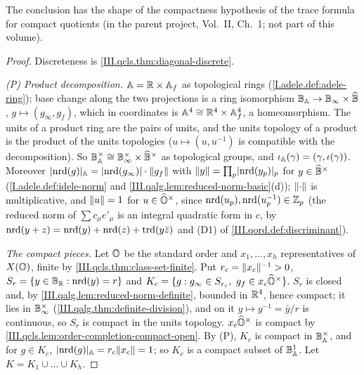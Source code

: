 \begin{theorem}
\end{theorem}
\noindent The conclusion has the shape of the compactness hypothesis of the trace formula for compact quotients (in the parent project, Vol.~II, Ch.~1; not part of this volume).
\begin{proof}
Discreteness is \cref{III.qcls.thm:diagonal-discrete}.

\emph{(P) Product decomposition.} $\mathbb{A}=\mathbb{R}\times\mathbb{A}_f$ as topological rings (\cref{I.adele.def:adele-ring}); base change along the two projections is a ring
isomorphism $\mathbb{B}_{\mathbb{A}}\to\mathbb{B}_{\infty}\times\widehat{\mathbb{B}}$, $g\mapsto(g_\infty,g_f)$, which in coordinates is $\mathbb{A}^4\cong\mathbb{R}^4\times\mathbb{A}_f^4$, a homeomorphism. The units of a product
ring are the pairs of units, and the units topology of a product is the product of the units topologies ($u\mapsto(u,u^{-1})$ is compatible with the
decomposition). So $\mathbb{B}_{\mathbb{A}}^\times\cong\mathbb{B}_{\infty}^\times\times\widehat{\mathbb{B}}^\times$ as topological groups, and $\iota_{\mathbb{A}}(\gamma)=(\gamma,\iota(\gamma))$. Moreover
$\lvert\operatorname{nrd}(g)\rvert_{\mathbb{A}}=\lvert\operatorname{nrd}(g_\infty)\rvert\cdot\lVert g_f\rVert$ with $\lVert y\rVert=\prod_p\lvert\operatorname{nrd}(y_p)\rvert_p$ for $y\in\widehat{\mathbb{B}}^\times$ (\cref{I.adele.def:idele-norm} and
\cref{III.qalg.lem:reduced-norm-basic}(d)); $\lVert\cdot\rVert$ is multiplicative, and $\lVert u\rVert=1$ for $u\in\widehat{\mathbb{O}}^\times$, since $\operatorname{nrd}(u_p),\operatorname{nrd}(u_p^{-1})\in\mathbb{Z}_p$
(the reduced norm of $\sum c_\mu e'_\mu$ is an integral quadratic form in $c$, by $\operatorname{nrd}(y+z)=\operatorname{nrd}(y)+\operatorname{nrd}(z)+\operatorname{trd}(y\bar z)$ and (D1) of
\cref{III.qord.def:discriminant}).

\emph{The compact pieces.} Let $\mathbb{O}$ be the standard order and $x_1,\dots,x_h$ representatives of $X(\mathbb{O})$, finite by
\cref{III.qcls.thm:class-set-finite}. Put $r_c=\lVert x_c\rVert^{-1}>0$, $S_r=\{y\in\mathbb{B}_{\mathbb{R}}:\operatorname{nrd}(y)=r\}$ and $K_c=\{g:g_\infty\in S_{r_c},\ g_f\in x_c\widehat{\mathbb{O}}^\times\}$.
$S_r$ is closed and, by \cref{III.qalg.lem:reduced-norm-definite}, bounded in $\mathbb{R}^4$, hence compact; it lies in $\mathbb{B}_{\infty}^\times$
(\cref{III.qalg.thm:definite-division}), and on it $y\mapsto y^{-1}=\bar y/r$ is continuous, so $S_r$ is compact in the units topology. $x_c\widehat{\mathbb{O}}^\times$ is
compact by \cref{III.qcls.lem:order-completion-compact-open}. By (P), $K_c$ is compact in $\mathbb{B}_{\mathbb{A}}^\times$, and for $g\in K_c$,
$\lvert\operatorname{nrd}(g)\rvert_{\mathbb{A}}=r_c\lVert x_c\rVert=1$; so $K_c$ is a compact subset of $\mathbb{B}_{\mathbb{A}}^1$. Let $K=K_1\cup\dots\cup K_h$.


\end{proof}
